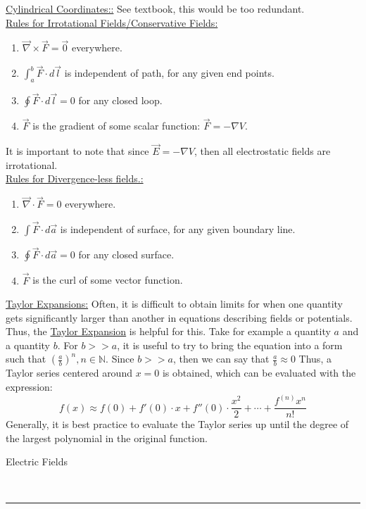 \documentclass{article}
\newcommand{\header}[1]{\begin{large}\noindent #1\end{large}\\\rule{\textwidth}{0.5pt}}
\newcommand{\gap}{\medskip\\}
\newcommand{\sheader}[1]{\underline{#1:}}
\newcommand{\sgap}{\smallskip\\}
\begin{document}
\sheader{Cylindrical Coordinates:} See textbook, this would be too redundant.
\gap
\sheader{Rules for Irrotational Fields/Conservative Fields}
\begin{enumerate}
    \item $\vec{\nabla} \times \vec{F} = \vec{0}$ everywhere.
    \item $\int_a^b\vec{F}\cdot d\vec{l}$ is independent of path, for any given end points.
    \item $\oint \vec{F}\cdot d\vec{l} = 0$ for any closed loop.
    \item $\vec{F}$ is the gradient of some scalar function: $\vec{F} = -\nabla V$.
\end{enumerate}
It is important to note that since $\vec{E} = -\nabla V$, then all electrostatic fields 
are irrotational.
\sgap
\sheader{Rules for Divergence-less fields.}
\begin{enumerate}
    \item $\vec{\nabla} \cdot \vec{F} = 0$ everywhere.
    \item $\int \vec{F} \cdot d\vec{a}$ is independent of surface, for any given boundary line.
    \item $\oint \vec{F} \cdot d\vec{a} = 0$ for any closed surface.
    \item $\vec{F}$ is the curl of some vector function.
\end{enumerate}
\sheader{Taylor Expansions} Often, it is difficult to obtain limits for when one quantity
gets significantly larger than another in equations describing fields or potentials.
Thus, the \underline{Taylor Expansion} is helpful for this. Take for example a quantity $a$
and a quantity $b$. For $b >> a$, it is useful to try to bring the equation into a form
such that $\left(\frac{a}{b}\right)^n, n \in \mathbb{N}$. Since $b >> a$, then we can say that $\frac{a}{b} \approx 0$
Thus, a Taylor series centered around $x = 0$ is obtained, which can be evaluated with
the expression:
\[
    f(x) \approx f(0) + f'(0) \cdot x  + f''(0) \cdot \frac{x^2}{2} + \cdots + \frac{f^{(n)}x^n}{n!}   
\]
Generally, it is best practice to evaluate the Taylor series up until the degree of the
largest polynomial in the original function.

\pagebreak
\header{Electric Fields}
\end{document}
